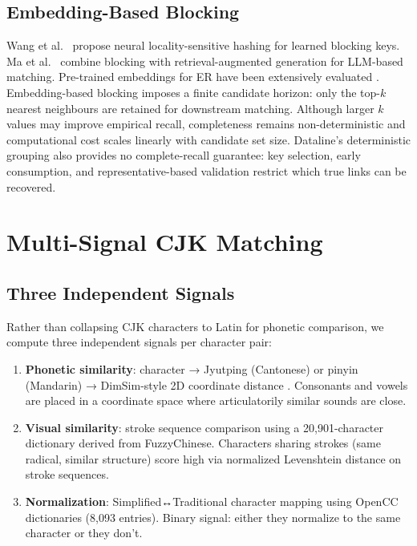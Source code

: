 \documentclass{article}
\begin{document}
\subsection{Embedding-Based Blocking}

Wang et al.\ \cite{wang2024neurallsh} propose neural locality-sensitive hashing for learned blocking keys. Ma et al.\ \cite{ma2025rag} combine blocking with retrieval-augmented generation for LLM-based matching. Pre-trained embeddings for ER have been extensively evaluated \cite{skoutas2023embeddings}. Embedding-based blocking imposes a finite candidate horizon: only the top-$k$ nearest neighbours are retained for downstream matching. Although larger $k$ values may improve empirical recall, completeness remains non-deterministic and computational cost scales linearly with candidate set size. Dataline's deterministic grouping also provides no complete-recall guarantee: key selection, early consumption, and representative-based validation restrict which true links can be recovered.

\section{Multi-Signal CJK Matching}\label{sec:signals}

\subsection{Three Independent Signals}

Rather than collapsing CJK characters to Latin for phonetic comparison, we compute three independent signals per character pair:

\begin{enumerate}
\tightlist
\item \textbf{Phonetic similarity}: character → Jyutping (Cantonese) or pinyin (Mandarin) → DimSim-style 2D coordinate distance \cite{dimsim}. Consonants and vowels are placed in a coordinate space where articulatorily similar sounds are close.
\item \textbf{Visual similarity}: stroke sequence comparison using a 20,901-character dictionary derived from FuzzyChinese. Characters sharing strokes (same radical, similar structure) score high via normalized Levenshtein distance on stroke sequences.
\item \textbf{Normalization}: Simplified↔Traditional character mapping using OpenCC dictionaries (8,093 entries). Binary signal: either they normalize to the same character or they don't.
\end{enumerate}
\end{document}
